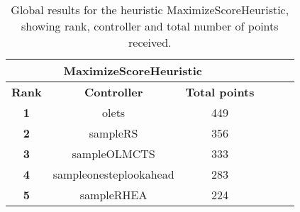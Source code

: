 \begin{table*}[!t]
\begin{center}
\begin{tabular}{|c|c|c|c|c|c|}
\multicolumn{3}{c}{\textbf{MaximizeScoreHeuristic}}\\
\hline
\textbf{Rank} & \textbf{Controller} & \textbf{Total points}\\
\hline
\textbf{1} & olets & 449
 \\
\hline
\textbf{2} & sampleRS & 356
 \\
\hline
\textbf{3} & sampleOLMCTS & 333
 \\
\hline
\textbf{4} & sampleonesteplookahead & 283
 \\
\hline
\textbf{5} & sampleRHEA & 224
 \\
\hline
\end{tabular}
\caption{Global results for the heuristic MaximizeScoreHeuristic, showing rank, controller and total number of points received.}
\label{tab:weights}
\end{center}
\end{table*}

